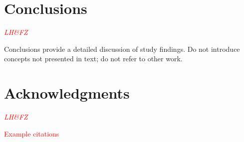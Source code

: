 \documentclass[journal]{new-aiaa}
\begin{document}

















\section{Conclusions}

\textcolor{red}{\emph{LH\&FZ}}

Conclusions provide a detailed discussion of study findings. Do not introduce concepts not presented in text; do not refer to other work.



\section*{Acknowledgments} %

\textcolor{red}{\emph{LH\&FZ}}


\textcolor{red}{Example citations}

\cite{nakamura1993bluffbody}


\end{document}
